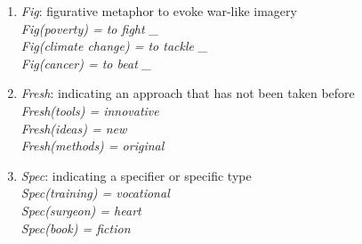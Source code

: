 \documentclass[a4paper]{article}
\begin{document}
\begin{enumerate}
\begin{enumerate}[label=\arabic*.]
			\item \textit{Fig}: figurative metaphor to evoke war-like imagery \\
				\textit{Fig(poverty) = to fight \_}\\
				\textit{Fig(climate change) = to tackle \_} \\
				\textit{Fig(cancer) = to beat \_} \\

			\item \textit{Fresh}: indicating an approach that has not been taken
				before\\
				\textit{Fresh(tools) = innovative} \\
				\textit{Fresh(ideas) = new} \\
				\textit{Fresh(methods) = original} \\

			\item \textit{Spec}: indicating a specifier or specific type \\
				\textit{Spec(training) = vocational} \\
				\textit{Spec(surgeon) = heart} \\
				\textit{Spec(book) = fiction}

		\end{enumerate}

\end{enumerate}
\end{document}
